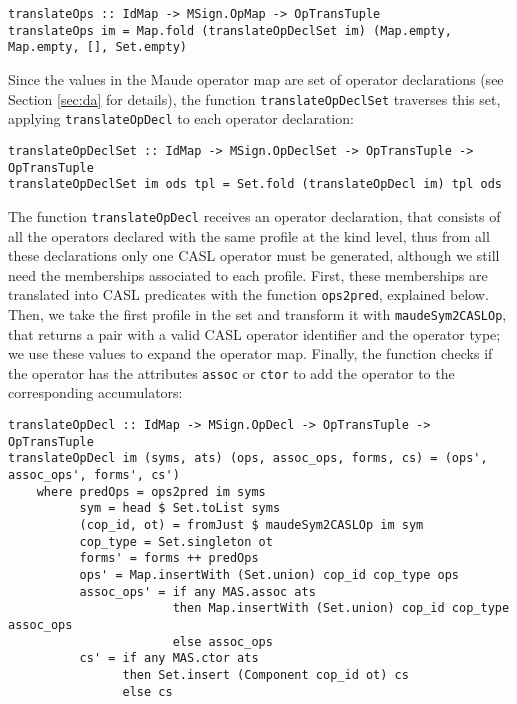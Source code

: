 {\codesize
\begin{verbatim}
translateOps :: IdMap -> MSign.OpMap -> OpTransTuple
translateOps im = Map.fold (translateOpDeclSet im) (Map.empty, Map.empty, [], Set.empty)
\end{verbatim}
}

Since the values in the Maude operator map are set of operator declarations
(see Section \ref{sec:da} for details),
the function \verb"translateOpDeclSet" traverses this set, applying
\verb"translateOpDecl" to each operator declaration:

{\codesize
\begin{verbatim}
translateOpDeclSet :: IdMap -> MSign.OpDeclSet -> OpTransTuple -> OpTransTuple
translateOpDeclSet im ods tpl = Set.fold (translateOpDecl im) tpl ods
\end{verbatim}
}

The function \verb"translateOpDecl" receives an operator declaration,
that consists of all the operators declared with the same profile at
the kind level, thus from all these declarations only one CASL operator
must be generated, although we still need the memberships associated
to each profile. First, these memberships are translated into CASL
predicates with the function \verb"ops2pred", explained below.
Then, we take the first profile in the set and transform
it with \verb"maudeSym2CASLOp", that returns a pair with a valid CASL
operator identifier and the operator type; we use these values
to expand the operator map. Finally, the function checks if the operator
has the attributes \texttt{assoc} or \texttt{ctor} to add the
operator to the corresponding accumulators:

{\codesize
\begin{verbatim}
translateOpDecl :: IdMap -> MSign.OpDecl -> OpTransTuple -> OpTransTuple
translateOpDecl im (syms, ats) (ops, assoc_ops, forms, cs) = (ops', assoc_ops', forms', cs')
    where predOps = ops2pred im syms
          sym = head $ Set.toList syms
          (cop_id, ot) = fromJust $ maudeSym2CASLOp im sym
          cop_type = Set.singleton ot
          forms' = forms ++ predOps
          ops' = Map.insertWith (Set.union) cop_id cop_type ops
          assoc_ops' = if any MAS.assoc ats
                       then Map.insertWith (Set.union) cop_id cop_type assoc_ops
                       else assoc_ops
          cs' = if any MAS.ctor ats
                then Set.insert (Component cop_id ot) cs
                else cs
\end{verbatim}
}

